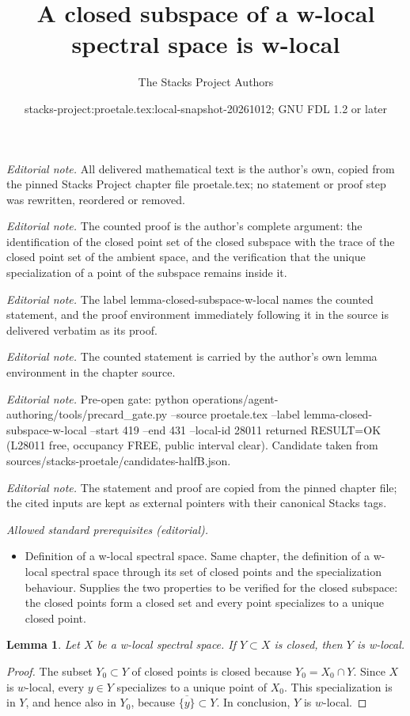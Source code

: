\documentclass[10pt,a4paper]{amsart}
\title{A closed subspace of a w-local spectral space is w-local}
\author{The Stacks Project Authors}
\date{stacks-project:proetale.tex:local-snapshot-20261012; GNU FDL 1.2 or later}
\theoremstyle{plain}
\newtheorem{lemma}[subsection]{Lemma}
\theoremstyle{definition}
\theoremstyle{remark}
\numberwithin{equation}{subsection}
\begin{document}
\maketitle
\noindent\textit{Editorial note.} All delivered mathematical text is the author's own, copied from the pinned Stacks Project chapter file proetale.tex; no statement or proof step was rewritten, reordered or removed.\par\medskip
\noindent\textit{Editorial note.} The counted proof is the author's complete argument: the identification of the closed point set of the closed subspace with the trace of the closed point set of the ambient space, and the verification that the unique specialization of a point of the subspace remains inside it.\par\medskip
\noindent\textit{Editorial note.} The label lemma-closed-subspace-w-local names the counted statement, and the proof environment immediately following it in the source is delivered verbatim as its proof.\par\medskip
\noindent\textit{Editorial note.} The counted statement is carried by the author's own lemma environment in the chapter source.\par\medskip
\noindent\textit{Editorial note.} Pre-open gate: python operations/agent-authoring/tools/precard\_gate.py --source proetale.tex --label lemma-closed-subspace-w-local --start 419 --end 431 --local-id 28011 returned RESULT=OK (L28011 free, occupancy FREE, public interval clear). Candidate taken from sources/stacks-proetale/candidates-halfB.json.\par\medskip
\noindent\textit{Editorial note.} The statement and proof are copied from the pinned chapter file; the cited inputs are kept as external pointers with their canonical Stacks tags.\par\medskip
\noindent\textit{Allowed standard prerequisites (editorial).}\begin{itemize}
\item Definition of a w-local spectral space. Same chapter, the definition of a w-local spectral space through its set of closed points and the specialization behaviour. Supplies the two properties to be verified for the closed subspace: the closed points form a closed set and every point specializes to a unique closed point.
\end{itemize}\medskip
\begin{lemma}
\label{lemma-closed-subspace-w-local}
Let $X$ be a w-local spectral space. If $Y \subset X$ is closed,
then $Y$ is w-local.
\end{lemma}

\begin{proof}
The subset $Y_0 \subset Y$ of closed points is closed because
$Y_0 = X_0 \cap Y$. Since $X$ is $w$-local, every $y \in Y$ specializes
to a unique point of $X_0$. This specialization is in $Y$, and hence
also in $Y_0$, because $\overline{\{y\}}\subset Y$. In conclusion, $Y$
is $w$-local.
\end{proof}
\end{document}
